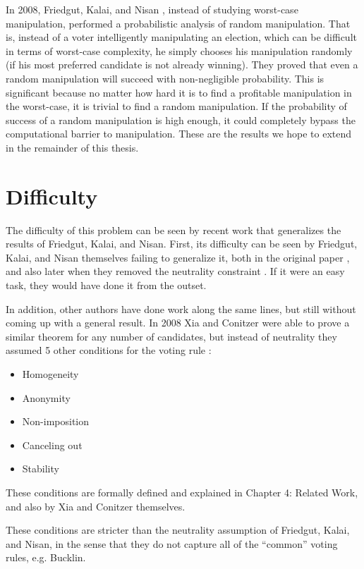 	In 2008, Friedgut, Kalai, and Nisan \cite{friedgut2008elections}, instead of studying worst-case manipulation, performed a probabilistic analysis of random manipulation. That is, instead of a voter intelligently manipulating an election, which can be difficult in terms of worst-case complexity, he simply chooses his manipulation randomly (if his most preferred candidate is not already winning). They proved that even a random manipulation will succeed with non-negligible probability. This is significant because no matter how hard it is to find a profitable manipulation in the worst-case, it is trivial to find a random manipulation. If the probability of success of a random manipulation is high enough, it could completely bypass the computational barrier to manipulation. These are the results we hope to extend in the remainder of this thesis.


\section{Difficulty}

	The difficulty of this problem can be seen by recent work that generalizes the results of Friedgut, Kalai, and Nisan. First, its difficulty can be seen by Friedgut, Kalai, and Nisan themselves failing to generalize it, both in the original paper \cite{friedgut2008elections}, and also later when they removed the neutrality constraint \cite{friedgut2011quantitative}. If it were an easy task, they would have done it from the outset.

	In addition, other authors have done work along the same lines, but still without coming up with a general result. In 2008 Xia and Conitzer were able to prove a similar theorem for any number of candidates, but instead of neutrality they assumed 5 other conditions for the voting rule \cite{xia2008sufficient}:

	\begin{itemize}
		\item Homogeneity
		\item Anonymity
		\item Non-imposition
		\item Canceling out
		\item Stability
	\end{itemize}

	These conditions are formally defined and explained in Chapter 4: Related Work, and also by Xia and Conitzer themselves.

	These conditions are stricter than the neutrality assumption of Friedgut, Kalai, and Nisan, in the sense that they do not capture all of the ``common'' voting rules, e.g. Bucklin.

